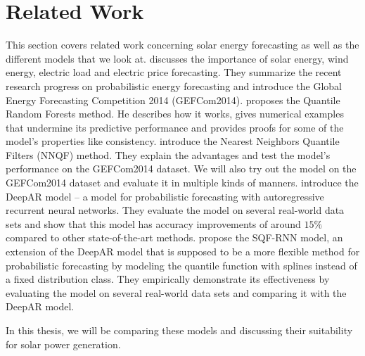 \section{Related Work}
\label{sec:related-work}

This section covers related work concerning solar energy forecasting as well as 
the different models that we look at. 
\Textcite{Hong2016} discusses the importance of solar energy, wind energy, electric load 
and electric price forecasting. They summarize the recent research progress on probabilistic 
energy forecasting and introduce the Global Energy Forecasting Competition 2014 (GEFCom2014).
\Textcite{Meinshausen2006} proposes the Quantile Random Forests method. He describes 
how it works, gives numerical examples that undermine its predictive performance
and provides proofs for some of the model's properties like consistency. 
\Textcite{Ordiano2019} introduce the Nearest Neighbors Quantile Filters (NNQF) method. 
They explain the advantages and test the model's performance on the GEFCom2014 dataset. 
We will also try out the model on the GEFCom2014 dataset and evaluate 
it in multiple kinds of manners.
\Textcite{Salinas2017} introduce the DeepAR model -- a model for probabilistic forecasting 
with autoregressive recurrent neural networks. They evaluate the model on several 
real-world data sets and show that this model has accuracy improvements of around 
\(15\%\) compared to other state-of-the-art methods.
\Textcite{Gasthaus2019} propose the SQF-RNN model, an extension of the DeepAR model 
that is supposed to be a more flexible method for probabilistic forecasting 
by modeling the quantile function with splines instead of a fixed distribution class.
They empirically demonstrate its effectiveness by evaluating the model on several real-world 
data sets and comparing it with the DeepAR model.

In this thesis, we will be comparing these models and discussing 
their suitability for solar power generation.